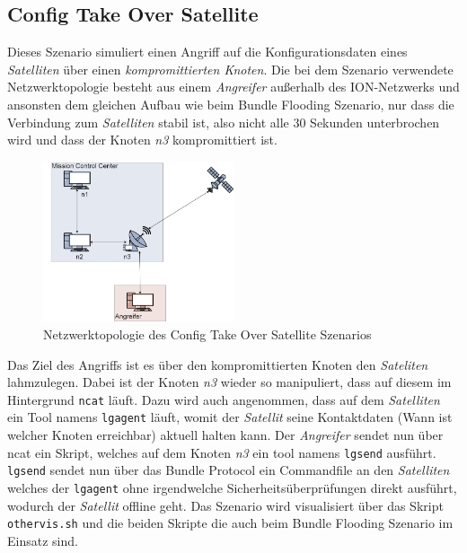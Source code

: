 \documentclass{article}
\begin{document}
\subsection{Config Take Over Satellite}
Dieses Szenario simuliert einen Angriff auf die Konfigurationsdaten eines \textit{Satelliten} über einen \textit{kompromittierten Knoten}. Die bei dem Szenario verwendete Netzwerktopologie besteht aus einem \textit{Angreifer} außerhalb des ION-Netzwerks und ansonsten dem gleichen Aufbau wie beim Bundle Flooding Szenario, nur dass die Verbindung zum \textit{Satelliten} stabil ist, also nicht alle 30 Sekunden unterbrochen wird und dass der Knoten \textit{n3} kompromittiert ist.
\par
\begin{figure}[h]
\centering
\includegraphics[width=0.5\textwidth]{ctos}
\caption{Netzwerktopologie des Config Take Over Satellite Szenarios}
\end{figure}
Das Ziel des Angriffs ist es über den kompromittierten Knoten den \textit{Sateliten} lahmzulegen.
Dabei ist der Knoten \textit{n3} wieder so manipuliert, dass auf diesem im Hintergrund \texttt{ncat} läuft. Dazu wird auch angenommen, dass auf dem \textit{Satelliten} ein Tool namens \texttt{lgagent} läuft, womit der \textit{Satellit} seine Kontaktdaten (Wann ist welcher Knoten erreichbar) aktuell halten kann.
Der \textit{Angreifer} sendet nun über ncat ein Skript, welches auf dem Knoten \textit{n3} ein tool namens \texttt{lgsend} ausführt. \texttt{lgsend} sendet nun über das Bundle Protocol ein Commandfile an den \textit{Satelliten} welches der \texttt{lgagent} ohne irgendwelche Sicherheitsüberprüfungen direkt ausführt, wodurch der \textit{Satellit} offline geht.
Das Szenario wird visualisiert über das Skript \texttt{othervis.sh} und die beiden Skripte die auch beim Bundle Flooding Szenario im Einsatz sind.
\end{document}
